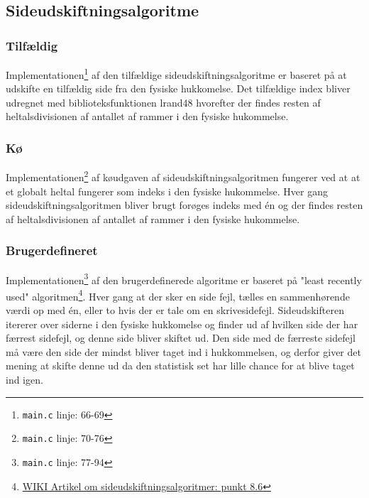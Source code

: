 \subsection{Sideudskiftningsalgoritme}
\label{pagereplacementalgorithms}
\subsubsection{Tilfældig}
Implementationen\footnote{\texttt{main.c} linje: 66-69} af den tilfældige sideudskiftningsalgoritme er baseret på at udskifte en tilfældig side fra den fysiske hukkomelse. Det tilfældige index bliver udregnet med biblioteksfunktionen lrand48 hvorefter der findes resten af heltalsdivisionen af antallet af rammer i den fysiske hukommelse.

\subsubsection{Kø}
Implementationen\footnote{\texttt{main.c} linje: 70-76} af køudgaven af sideudskiftningsalgoritmen fungerer ved at at et globalt heltal fungerer som indeks i den fysiske hukommelse. Hver gang sideudskiftningsalgoritmen bliver brugt forøges indeks med én og der findes resten af heltalsdivisionen af antallet af rammer i den fysiske hukommelse.

\subsubsection{Brugerdefineret}
Implementationen\footnote{\texttt{main.c} linje: 77-94} af den brugerdefinerede algoritme er baseret på "least recently used" algoritmen\footnote{\href{https://en.wikipedia.org/wiki/Page_replacement_algorithm}{WIKI Artikel om sideudskiftningsalgoritmer: punkt 8.6}}. Hver gang at der sker en side fejl, tælles en sammenhørende værdi op med én, eller to hvis der er tale om en skrivesidefejl. Sideudskifteren itererer over siderne i den fysiske hukkomelse og finder ud af hvilken side der har færrest sidefejl, og denne side bliver skiftet ud. Den side med de færreste sidefejl må være den side der mindst bliver taget ind i hukkommelsen, og derfor giver det mening at skifte denne ud da den statistisk set har lille chance for at blive taget ind igen.
